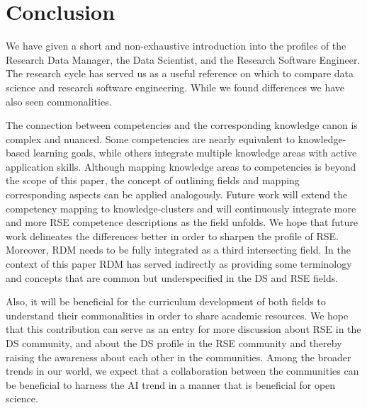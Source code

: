 \documentclass[
        english,biblatex
    ]{lni}
\begin{document}
    \section{Conclusion}\label{conclusion}

    We have given a short and non-exhaustive introduction into the
    profiles of the Research Data Manager, the Data Scientist, and the
    Research Software Engineer. The research cycle has served us as a
    useful reference on which to compare data science and research
    software engineering. While we found differences we have also seen
    commonalities.

    The connection between competencies and the corresponding knowledge
    canon is complex and nuanced. Some competencies are nearly
    equivalent to knowledge-based learning goals, while others integrate
    multiple knowledge areas with active application skills. Although
    mapping knowledge areas to competencies is beyond the scope of this
    paper, the concept of outlining fields and mapping corresponding
    aspects can be applied analogously. Future work will extend the
    competency mapping to
    knowledge-clusters\autocite{SWEBOK2014,DSBOK2017} and will
    continuously integrate more and more RSE competence descriptions as
    the field unfolds. We hope that future work delineates the
    differences better in order to sharpen the profile of RSE. Moreover,
    RDM needs to be fully integrated as a third intersecting field. In
    the context of this paper RDM has served indirectly as providing
    some terminology and concepts that are common but underspecified in
    the DS and RSE fields.

    Also, it will be beneficial for the curriculum development of both
    fields to understand their commonalities in order to share academic
    resources. We hope that this contribution can serve as an entry for
    more discussion about RSE in the DS community, and about the DS
    profile in the RSE community and thereby raising the awareness about
    each other in the communities. Among the broader trends in our
    world, we expect that a collaboration between the communities can be
    beneficial to harness the AI trend in a manner that is beneficial
    for open science.

    \printbibliography

\end{document}
